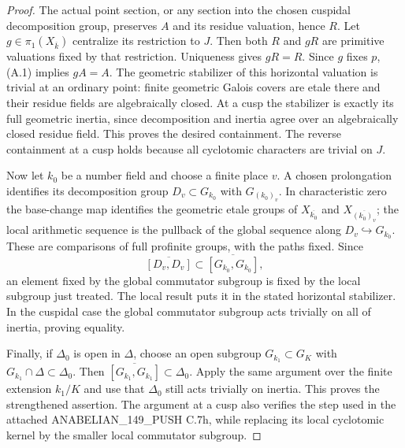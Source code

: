 \begin{proof}
The actual point section, or any section into the chosen cuspidal
decomposition group, preserves $A$ and its residue valuation, hence $R$.
Let $g\in\pi_1(X_{\overline k})$ centralize its restriction to $J$.
Then both $R$ and $gR$ are primitive valuations fixed by that restriction.
Uniqueness gives $gR=R$. Since $g$ fixes $p$, (A.1) implies $gA=A$.
The geometric stabilizer of this horizontal valuation is trivial at an
ordinary point: finite geometric Galois covers are etale there and their
residue fields are algebraically closed. At a cusp the stabilizer is exactly
its full geometric inertia, since decomposition and inertia agree over an
algebraically closed residue field. This proves the desired containment.
The reverse containment at a cusp holds because all cyclotomic characters
are trivial on $J$.

Now let $k_0$ be a number field and choose a finite place $v$. A chosen
prolongation identifies its decomposition group $D_v\subset G_{k_0}$ with
$G_{(k_0)_v}$. In characteristic zero the base-change map identifies the
geometric etale groups of $X_{\overline{k_0}}$ and
$X_{\overline{(k_0)_v}}$; the local arithmetic sequence is the pullback
of the global sequence along $D_v\hookrightarrow G_{k_0}$. These are
comparisons of full profinite groups, with the paths fixed. Since
\[
 \overline{[D_v,D_v]}
       \subset \overline{[G_{k_0},G_{k_0}]},
\]
an element fixed by the global commutator subgroup is fixed by the local
subgroup just treated. The local result puts it in the stated horizontal
stabilizer. In the cuspidal case the global commutator subgroup acts trivially
on all of inertia, proving equality.

Finally, if $\Delta_0$ is open in $\Delta$, choose an open subgroup
$G_{k_1}\subset G_K$ with $G_{k_1}\cap\Delta\subset\Delta_0$.
Then $\overline{[G_{k_1},G_{k_1}]}\subset\Delta_0$.
Apply the same argument over the finite extension $k_1/K$ and use that
$\Delta_0$ still acts trivially on inertia. This proves the strengthened
assertion. The argument at a cusp also verifies the step used in the
attached ANABELIAN\_149\_PUSH C.7h, while replacing its local cyclotomic
kernel by the smaller local commutator subgroup.
\end{proof}


